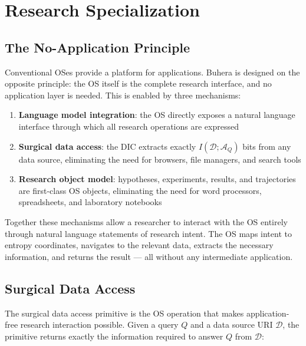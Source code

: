\documentclass[12pt,twocolumn]{article}
\begin{document}
\section{Research Specialization}
\label{sec:research}

\subsection{The No-Application Principle}

Conventional OSes provide a platform for applications. Buhera is designed on the opposite principle: the OS itself is the complete research interface, and no application layer is needed. This is enabled by three mechanisms:

\begin{enumerate}
\item \textbf{Language model integration}: the OS directly exposes a natural language interface through which all research operations are expressed
\item \textbf{Surgical data access}: the DIC extracts exactly $I(\mathcal{D}; \mathcal{A}_Q)$ bits from any data source, eliminating the need for browsers, file managers, and search tools
\item \textbf{Research object model}: hypotheses, experiments, results, and trajectories are first-class OS objects, eliminating the need for word processors, spreadsheets, and laboratory notebooks
\end{enumerate}

Together these mechanisms allow a researcher to interact with the OS entirely through natural language statements of research intent. The OS maps intent to entropy coordinates, navigates to the relevant data, extracts the necessary information, and returns the result --- all without any intermediate application.

\subsection{Surgical Data Access}

The surgical data access primitive is the OS operation that makes application-free research interaction possible. Given a query $Q$ and a data source URI $\mathcal{D}$, the primitive returns exactly the information required to answer $Q$ from $\mathcal{D}$:
\end{document}
